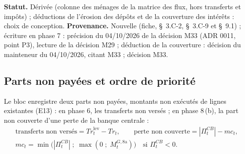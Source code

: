 \documentclass[11pt,a4paper]{article}
\begin{document}
\begin{proposee}
\textbf{Statut.} Dérivée (colonne des ménages de la matrice des flux, hors transferts et impôts) ; déductions de l'érosion des dépôts et de la couverture des intérêts : choix de conception. \textbf{Provenance.} Nouvelle (fiche, \S~3.C-2, \S~3.C-9 et \S~9.1) ; écriture en phase 7 : précision du 04/10/2026 de la décision M33 (ADR 0011, point P3), lecture de la décision M29 ; déduction de la couverture : décision du mainteneur du 04/10/2026, citant M33 ; décision M33.
\end{proposee}

\subsection{Parts non payées et ordre de priorité}
\label{sec:finances_publiques-caisse}
\begin{proposee}
Le bloc enregistre deux parts non payées, montants non exécutés de lignes existantes (E13) : en phase 6, les transferts non versés ; en phase 8\,(b), la part non couverte d'une perte de la banque centrale :
\begin{gather*}
\text{transferts non versés} = \mathit{Tr}^{\mathrm{lev}}_t - \mathit{Tr}_t, \qquad \text{perte non couverte} = |\Pi^{\mathit{CB}}_t| - \mathit{mc}_t, \tag{E13}\\
\mathit{mc}_t = \min\bigl(|\Pi^{\mathit{CB}}_t| \;;\; \max(0 \;;\; M^{G,8\mathrm{a}}_t)\bigr) \quad \text{si } \Pi^{\mathit{CB}}_t < 0 .
\end{gather*}


\end{proposee}
\end{document}
